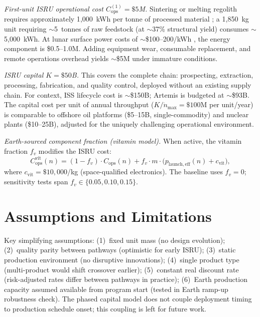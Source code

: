 \documentclass[preprint,12pt]{elsarticle}
\begin{document}
\emph{First-unit ISRU operational cost $C_{\mathrm{ops}}^{(1)} = \$5$M.} Sintering or melting regolith requires approximately 1{,}000~kWh per tonne of processed material \cite{cilliers2023}; a 1{,}850~kg unit requiring $\sim$5~tonnes of raw feedstock (at $\sim$37\% structural yield) consumes $\sim$5{,}000~kWh. At lunar surface power costs of $\sim$\$100--200/kWh \cite{sanders2015,lsic2021}, the energy component is \$0.5--1.0M. Adding equipment wear, consumable replacement, and remote operations overhead yields $\sim$\$5M under immature conditions.

\emph{ISRU capital $K = \$50$B.} This covers the complete chain: prospecting, extraction, processing, fabrication, and quality control, deployed without an existing supply chain. For context, ISS lifecycle cost is $\sim$\$150B; Artemis is budgeted at $\sim$\$93B. The capital cost per unit of annual throughput ($K/\dot{n}_{\max} = \$100$M per unit/year) is comparable to offshore oil platforms (\$5--15B, single-commodity) and nuclear plants (\$10--25B), adjusted for the uniquely challenging operational environment.

\emph{Earth-sourced component fraction (vitamin model).} When active, the vitamin fraction $f_v$ modifies the ISRU cost:
\begin{equation}
  C_{\mathrm{ops}}^{\mathrm{vit}}(n) = (1 - f_v) \cdot C_{\mathrm{ops}}(n) + f_v \cdot m \cdot \bigl(p_{\mathrm{launch,eff}}(n) + c_{\mathrm{vit}}\bigr),
  \label{eq:vitamin}
\end{equation}
where $c_{\mathrm{vit}} = \$10{,}000$/kg (space-qualified electronics). The baseline uses $f_v = 0$; sensitivity tests span $f_v \in \{0.05, 0.10, 0.15\}$.

\section{Assumptions and Limitations}
\label{sec:appendix_assumptions}

Key simplifying assumptions: (1)~fixed unit mass (no design evolution); (2)~quality parity between pathways (optimistic for early ISRU); (3)~static production environment (no disruptive innovations); (4)~single product type (multi-product would shift crossover earlier); (5)~constant real discount rate (risk-adjusted rates differ between pathways in practice); (6)~Earth production capacity assumed available from program start (tested in Earth ramp-up robustness check). The phased capital model does not couple deployment timing to production schedule onset; this coupling is left for future work.
\end{document}
